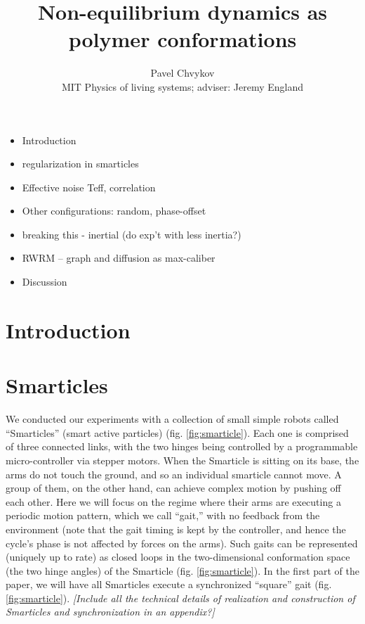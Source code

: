 \documentclass[11pt]{article}
\renewcommand{\=}[1]{\stackrel{#1}{=}} %
\renewcommand{\(}{\left (}
\renewcommand{\)}{\right  )}
\renewcommand{\[}{\left [}
\renewcommand{\]}{\right ]}
\newcommand{\<}{\left <}
\renewcommand{\>}{\right >}
\theoremstyle{definition}
\theoremstyle{remark}
\renewcommand{\todo}[1]{\textit{\color{red}[#1]}}
\begin{document}
		\title{Non-equilibrium dynamics as polymer conformations}
		
		\author{Pavel Chvykov\\
			MIT Physics of living systems; adviser: Jeremy England} %
		
		\maketitle


\tableofcontents

\begin{itemize}
	\item Introduction
	\item regularization in smarticles
	\item Effective noise Teff, correlation
	\item Other configurations: random, phase-offset
	\item breaking this - inertial (do exp't with less inertia?)
	\item RWRM -- graph and diffusion
	\subitem as max-caliber
	\item Discussion
\end{itemize}

\section{Introduction}

\section{Smarticles}
We conducted our experiments with a collection of small simple robots called ``Smarticles'' (smart active particles) (fig. \ref{fig:smarticle}). Each one is comprised of three connected links, with the two hinges being controlled by a programmable micro-controller via stepper motors. When the Smarticle is sitting on its base, the arms do not touch the ground, and so an individual smarticle cannot move. A group of them, on the other hand, can achieve complex motion by pushing off each other. Here we will focus on the regime where their arms are executing a periodic motion pattern, which we call ``gait,'' with no feedback from the environment (note that the gait timing is kept by the controller, and hence the cycle's phase is not affected by forces on the arms). Such gaits can be represented (uniquely up to rate) as closed loops in the two-dimensional conformation space (the two hinge angles) of the Smarticle (fig. \ref{fig:smarticle}). In the first part of the paper, we will have all Smarticles execute a synchronized ``square'' gait (fig. \ref{fig:smarticle}). \todo{Include all the technical details of realization and construction of Smarticles and synchronization in an appendix?}
\end{document}
